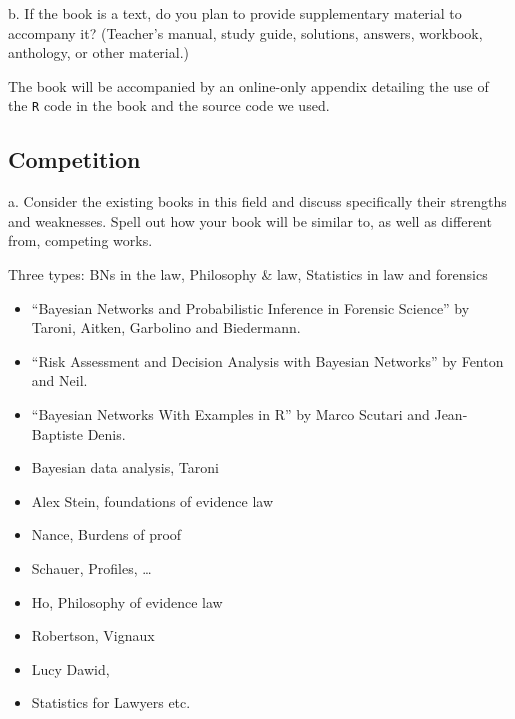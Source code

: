 \documentclass[
  10pt,
  dvipsnames,enabledeprecatedfontcommands]{scrartcl}
\begin{document}
\footnotesize b. If the book is a text, do you plan to provide
supplementary material to accompany it? (Teacher's manual, study guide,
solutions, answers, workbook, anthology, or other material.)

\vspace{2mm}

\normalsize

The book will be accompanied by an online-only appendix detailing the
use of the \texttt{R} code in the book and the source code we used.

\hypertarget{competition}{%
\subsection{Competition}\label{competition}}

\footnotesize a. Consider the existing books in this field and discuss
specifically their strengths and weaknesses. Spell out how your book
will be similar to, as well as different from, competing works.


\normalsize

Three types: BNs in the law, Philosophy \& law, Statistics in law and
forensics

\begin{itemize}
\item
  ``Bayesian Networks and Probabilistic Inference in Forensic Science''
  by Taroni, Aitken, Garbolino and Biedermann.
\item
  ``Risk Assessment and Decision Analysis with Bayesian Networks'' by
  Fenton and Neil.
\item
  ``Bayesian Networks With Examples in R'' by Marco Scutari and
  Jean-Baptiste Denis.
\item
  Bayesian data analysis, Taroni
\item
  Alex Stein, foundations of evidence law
\item
  Nance, Burdens of proof
\item
  Schauer, Profiles, \dots
\item
  Ho, Philosophy of evidence law
\item
  Robertson, Vignaux
\item
  Lucy Dawid,
\item
  Statistics for Lawyers etc.
\end{itemize}
\end{document}
